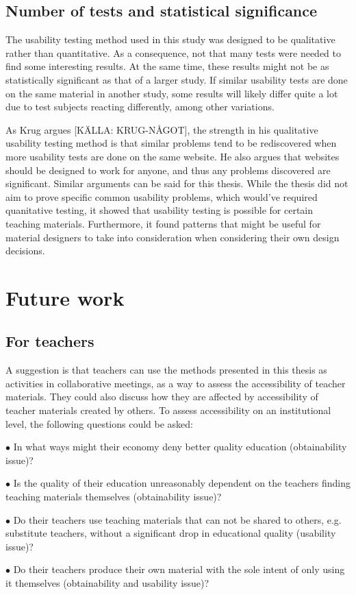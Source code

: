 \subsection{Number of tests and statistical significance}
The usability testing method used in this study was designed to be qualitative rather than quantitative. As a consequence, not that many tests were needed to find some interesting results. At the same time, these results might not be as statistically significant as that of a larger study. If similar usability tests are done on the same material in another study, some results will likely differ quite a lot due to test subjects reacting differently, among other variations.

As Krug argues [KÄLLA: KRUG-NÅGOT], the strength in his qualitative usability testing method is that similar problems tend to be rediscovered when more usability tests are done on the same website. He also argues that websites should be designed to work for anyone, and thus any problems discovered are significant. Similar arguments can be said for this thesis. While the thesis did not aim to prove specific common usability problems, which would've required quanitative testing, it showed that usability testing is possible for certain teaching materials. Furthermore, it found patterns that might be useful for material designers to take into consideration when considering their own design decisions.

\section{Future work}	
\subsection{For teachers}
A suggestion is that teachers can use the methods presented in this thesis as activities in collaborative meetings, as a way to assess the accessibility of teacher materials. They could also discuss how they are affected by accessibility of teacher materials created by others. To assess accessibility on an institutional level, the following questions could be asked:
\begin{description}
\item $\bullet$ In what ways might their economy deny better quality education (obtainability issue)? 
\item $\bullet$ Is the quality of their education unreasonably dependent on the teachers finding teaching materials themselves (obtainability issue)? 
\item $\bullet$ Do their teachers use teaching materials that can not be shared to others, e.g. substitute teachers, without a significant drop in educational quality (usability issue)?
\item $\bullet$ Do their teachers produce their own material with the sole intent of only using it themselves (obtainability and usability issue)?
\end{description}
